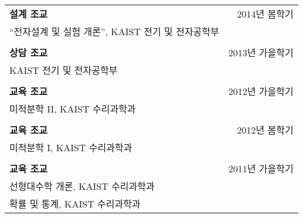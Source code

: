 \documentclass[11pt,a4paper]{article}
\begin{document}
\begin{tabular}{p{14cm}r}
\textbf{설계 조교} & 2014년 봄학기 \\
``전자설계 및 실험 개론'', KAIST 전기 및 전자공학부 & \\
\\
\textbf{상담 조교} & 2013년 가을학기 \\
KAIST 전기 및 전자공학부 & \\
\\
\textbf{교육 조교} & 2012년 가을학기 \\
미적분학 II, KAIST 수리과학과 & \\
\\
\textbf{교육 조교} & 2012년 봄학기 \\
미적분학 I, KAIST 수리과학과 & \\
\\
\textbf{교육 조교} & 2011년 가을학기 \\
선형대수학 개론, KAIST 수리과학과 & \\
확률 및 통계, KAIST 수리과학과 & \\
\end{tabular}
\end{document}
